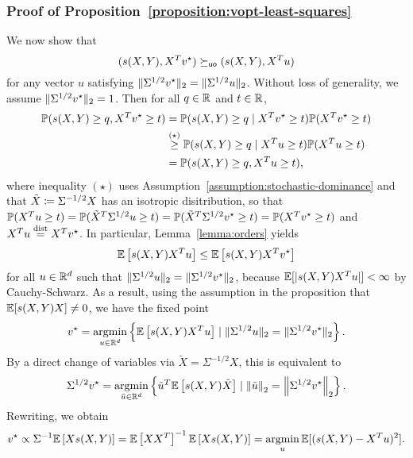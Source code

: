 \subsubsection{Proof of Proposition~\ref{proposition:vopt-least-squares}}
\label{sec:proof-vopt-least-squares}


We now show that
\begin{equation}
  \label{eqn:upper-dominance-vopt}
  (s(X, Y), X^T v^\star) \succeq_{\mathsf{uo}} (s(X, Y), X^T u)
\end{equation}
for any vector $u$ satisfying $\|{\Sigma^{1/2} v^\star}\|_2 =
\|{\Sigma^{1/2} u}\|_2$.  Without loss of generality, we assume
$\|{\Sigma^{1/2} v^\star}\|_2 = 1$.  Then for all $q \in \mathbb{R}$ and $t \in \mathbb{R}$,
\begin{align*}
  \mathbb{P}( s(X,Y) \ge q, X^T v^\star \ge t)
  & = \mathbb{P}( s(X,Y) \ge q \mid X^T v^\star \ge t) \mathbb{P}(X^T v^\star \ge t) \\
  &\stackrel{(\star)}{\ge}
  \mathbb{P}( s(X,Y) \ge q \mid  X^T u \ge t) \mathbb{P}(X^T u \ge t) \\
  & = \mathbb{P}( s(X,Y) \ge q, X^T u \ge t ),
\end{align*}
where inequality $(\star)$ uses
Assumption~\ref{assumption:stochastic-dominance} and that $\tilde{X} \coloneqq
\Sigma^{-1/2} X$ has an isotropic disitribution, so that $\mathbb{P}(X^T u \ge t) =
\mathbb{P}( \tilde{X}^T \Sigma^{1/2} u \ge t) = \mathbb{P}( \tilde{X}^T \Sigma^{1/2} v^\star
\ge t) = \mathbb{P}( X^T v^\star \ge t)$ and
$X^T u \stackrel{\textup{dist}}{=} X^T v^\star$.
In particular, Lemma~\ref{lemma:orders} yields
\begin{equation*}
  \mathbb{E} \left[ s(X,Y) X^T u \right] \le
  \mathbb{E} \left[ s(X,Y) X^T v^\star \right]
\end{equation*}
for all $u \in \mathbb{R}^d$ such that $\|{\Sigma^{1/2}u}\|_2 =
\|{\Sigma^{1/2}v^\star}\|_2$, because
$\mathbb{E}[|s(X, Y) X^T u|] < \infty$ by Cauchy-Schwarz.
As a result, using the assumption in the proposition that
$\mathbb{E}[s(X, Y) X] \neq 0$, we have the fixed point
\begin{align*}
  v^\star = \mathop{\rm argmin}_{u \in \mathbb{R}^d} \left\{ \mathbb{E} \left[ s(X,Y) X^T u \right]
  \mid \|{\Sigma^{1/2} u}\|_2 = \|{\Sigma^{1/2} v^\star}\|_2 \right\}.
\end{align*}
By a direct change of variables via $\tilde{X} = \Sigma^{-1/2} X$, this is
equivalent to
\begin{align*}
  \Sigma^{1/2} v^\star = \mathop{\rm argmin}_{\tilde{u} \in \mathbb{R}^d} \left\{ \tilde{u}^T \mathbb{E} \left[ s(X,Y) \tilde{X} \right] \mid \left\|{\tilde{u}}\right\|_2 = \left\|{\Sigma^{1/2} v^\star}\right\|_2 \right\}.
\end{align*}
Rewriting, we obtain
\begin{align*}
  v^\star \propto \Sigma^{-1} \mathbb{E} \left[X s(X,Y)\right]
  = \mathbb{E}\left[XX^T\right]^{-1} \mathbb{E} \left[ X s(X,Y) \right]
  = \mathop{\rm argmin}_u \mathbb{E}[(s(X, Y) - X^T u)^2].
\end{align*}

